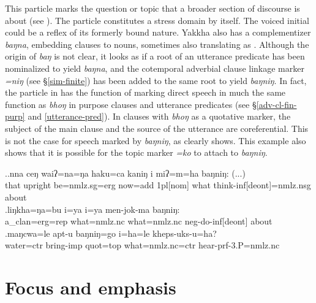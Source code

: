 This particle marks the question or topic that a broader section of discourse is about (see \Next). The particle constitutes a stress domain by itself. The voiced initial could be a reflex of its formerly bound nature. Yakkha also has a complementizer \emph{baŋna}, embedding clauses to nouns, sometimes also translating as . Although the origin of \emph{baŋ} is not clear, it looks as if a root of an utterance predicate has been  nominalized to yield \emph{baŋna}, and the cotemporal adverbial clause linkage marker  \emph{=niŋ} (see §\ref{sim-finite}) has been added to the same root to yield \emph{baŋniŋ}. In fact, the particle in \Next[c] has the function of marking direct speech in much the same function as \emph{bhoŋ} in purpose clauses and utterance predicates (see §\ref{adv-cl-fin-purp} and \ref{utterance-pred}). In clauses with  \emph{bhoŋ} as a quotative marker, the subject of the main clause and the source of the utterance are coreferential. This is not the case for speech marked by  \emph{baŋniŋ}, as \Next[c] clearly shows. This example also shows that it is possible for the topic marker \emph{=ko} to attach to  \emph{baŋniŋ}.

\ex.\ag.nna  ceŋ    waiʔ=na=ŋa      haku=ca   kaniŋ i  miʔ=m=ha baŋniŋ: (...)\\
that{\sc [nom]} upright be{\sc [3sg]=nmlz.sg=erg} now{\sc =add} {\sc 1pl[nom]} what think{\sc -inf[deont]=nmlz.nsg} about\\
 
\bg.\label{ex-bu}liŋkha=ŋa=bu         i=ya                i=ya                men-jok-ma              baŋniŋ:\\
a\_clan{\sc =erg=rep}  what{\sc =nmlz.nc} what{\sc =nmlz.nc} {\sc neg-}do{\sc -inf[deont]} about\\
 
\bg.maŋcwa=le          apt-u     baŋniŋ=go   i=ha=le        kheps-uks-u=ha? \\
water{\sc =ctr} bring{\sc -imp} {\sc quot=top} what{\sc =nmlz.nc=ctr} hear{\sc -prf-3.P=nmlz.nc} \\
 


\section{Focus and emphasis}\label{ptcl-foc}

